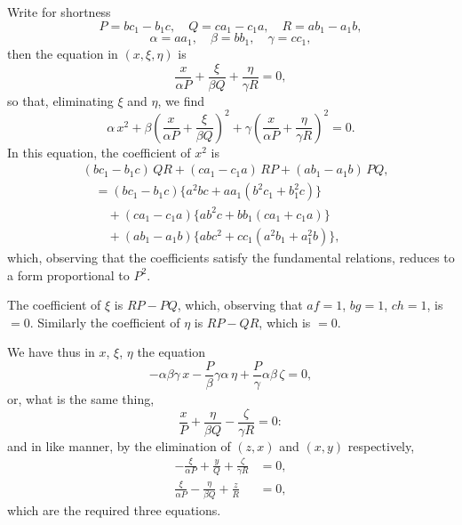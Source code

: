 \documentclass[11pt,a4paper]{article}
\theoremstyle{plain}
\theoremstyle{definition}
\theoremstyle{remark}
\begin{document}
Write for shortness
\[
P = bc_1 - b_1c,\quad Q = ca_1 - c_1a,\quad R = ab_1 - a_1b,
\]
\[
\alpha = aa_1,\quad \beta = bb_1,\quad \gamma = cc_1,
\]
then the equation in $(x,\xi,\eta)$ is
\[
\frac{x}{\alpha P} + \frac{\xi}{\beta Q} + \frac{\eta}{\gamma R} = 0,
\]
so that, eliminating $\xi$ and $\eta$, we find
\[
\alpha\,x^2 + \beta\left(\frac{x}{\alpha P} + \frac{\xi}{\beta Q}\right)^2 + \gamma\left(\frac{x}{\alpha P} + \frac{\eta}{\gamma R}\right)^2 = 0.
\]
In this equation, the coefficient of $x^2$ is
\begin{align*}
&(bc_1-b_1c)\,QR + (ca_1-c_1a)\,RP + (ab_1-a_1b)\,PQ,\\
&\quad = (bc_1-b_1c)\{a^2bc + aa_1(b^2c_1+b_1^2c)\} \\
&\quad\quad + (ca_1-c_1a)\{ab^2c + bb_1(ca_1+c_1a)\} \\
&\quad\quad + (ab_1-a_1b)\{abc^2 + cc_1(a^2b_1+a_1^2b)\},
\end{align*}
which, observing that the coefficients satisfy the fundamental relations, reduces to a form proportional to $P^2$.

The coefficient of $\xi$ is $RP - PQ$, which, observing that $af=1$, $bg=1$, $ch=1$, is $=0$. Similarly the coefficient of $\eta$ is $RP - QR$, which is $=0$.

We have thus in $x$, $\xi$, $\eta$ the equation
\[
-\alpha\beta\gamma\,x - \frac{P}{\beta}\gamma\alpha\,\eta + \frac{P}{\gamma}\alpha\beta\,\zeta = 0,
\]
or, what is the same thing,
\[
\frac{x}{P} + \frac{\eta}{\beta Q} - \frac{\zeta}{\gamma R} = 0:
\]
and in like manner, by the elimination of $(z,x)$ and $(x,y)$ respectively,
\begin{align*}
-\frac{\xi}{\alpha P} + \frac{y}{Q} + \frac{\zeta}{\gamma R} &= 0,\\
\frac{\xi}{\alpha P} - \frac{\eta}{\beta Q} + \frac{z}{R} &= 0,
\end{align*}
which are the required three equations.
\end{document}
